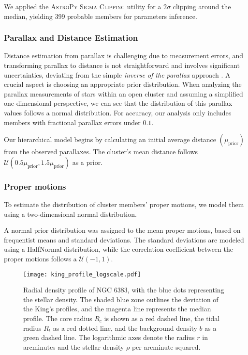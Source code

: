 \documentclass[baaa]{baaa}
\begin{document}
We applied the \textsc{AstroPy Sigma Clipping} utility \citep{astropy:2022} for a $2\sigma$ clipping around the median, yielding 399 probable members for parameters inference.

\subsubsection{Parallax and Distance Estimation}

Distance estimation from parallax is challenging due to measurement errors, and transforming parallax to distance is not straightforward and involves significant uncertainties, deviating from the simple \textit{inverse of the parallax} approach \citep{2015PASP..127..994B,2021AJ....161..147B}. A crucial aspect is choosing an appropriate prior distribution. When analyzing the parallax measurements of stars within an open cluster and assuming a simplified one-dimensional perspective, we can see that the distribution of this parallax values follows a normal distribution. For accuracy, our analysis only includes members with fractional parallax errors under $0.1$.

Our hierarchical model begins by calculating an initial average distance $(\mu_{\mathrm{prior}})$ from the observed parallaxes. The cluster's mean distance follows $\mathcal{U}(0.5\mu_{\mathrm{prior}},1.5\mu_{\mathrm{prior}})$ as a prior.
\subsubsection{Proper motions}
To estimate the distribution of cluster members' proper motions, we model them using a two-dimensional normal distribution. 

A normal prior distribution was assigned to the mean proper motions, based on frequentist means and standard deviations. The standard deviations are modeled using a HalfNormal distribution, while the correlation coefficient between the proper motions follows a $\mathcal{U}(-1, 1)$.

\begin{figure}
    \centering
    \texttt{[image: king\_profile\_logscale.pdf]}
    \caption{Radial density profile of NGC 6383, with the blue dots representing the stellar density. The shaded blue zone outlines the deviation of the King's profiles, and the magenta line represents the median profile. The core radius $R_c$ is shown as a red dashed line, the tidal radius $R_t$ as a red dotted line, and the background density $b$ as a green dashed line. The logarithmic axes denote the radius $r$ in arcminutes and the stellar density $\rho$ per arcminute squared.}
    \label{fig:king_profile}
\end{figure}
\end{document}
